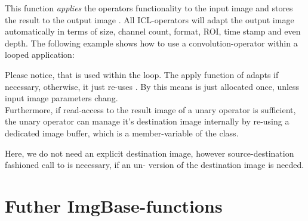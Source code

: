 
This function \emph{applies} the operators functionality to the input image  and stores the result to the output image . All ICL-operators will adapt the output image automatically in terms of size, channel count, format, ROI, time stamp and even depth. The following example shows how to use a convolution-operator within a looped application:


Please notice, that  is used within the loop. The apply function of  adapts  if necessary, otherwise, it just re-uses . By this means  is just allocated once, unless input image parameters chang.\\
Furthermore, if read-access to the result image of a unary operator is sufficient, the unary operator can manage it's destination image internally by re-using a dedicated
image buffer, which is a member-variable of the  class.


Here, we do not need an explicit destination image, however source-destination fashioned call to  is necessary, if an un- version of the destination image is needed.


\section{Futher ImgBase-functions}


